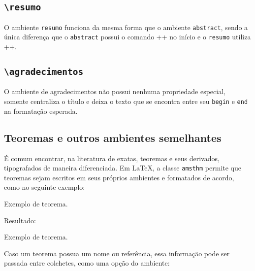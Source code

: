 \documentclass[xindy,rascunho]{fei}
\begin{document}
    \subsection{\texttt{\textbackslash resumo}}
    O ambiente \texttt{resumo} funciona da mesma forma que o ambiente \texttt{abstract}, sendo a única diferença que o \texttt{abstract} possui o comando \latexinline++ no início e o \texttt{resumo} utiliza \latexinline++.

    \subsection{\texttt{\textbackslash agradecimentos}}
    O ambiente de agradecimentos não possui nenhuma propriedade especial, somente centraliza o título e deixa o texto que se encontra entre seu \texttt{begin} e \texttt{end} na formatação esperada.
    
    \subsection{Teoremas e outros ambientes semelhantes}
    É comum encontrar, na literatura de exatas, teoremas e seus derivados, tipografados de maneira diferenciada. Em \LaTeX, a classe \texttt{amsthm} permite que teoremas sejam escritos em seus próprios ambientes e formatados de acordo, como no seguinte exemplo:
    
\begin{latexcode}
\begin{teorema}
Exemplo de teorema.
\end{teorema}
\end{latexcode}

Resultado:

\begin{teorema}
Exemplo de teorema.
\end{teorema}

Caso um teorema possua um nome ou referência, essa informação pode ser passada entre colchetes, como uma opção do ambiente:
\end{document}
